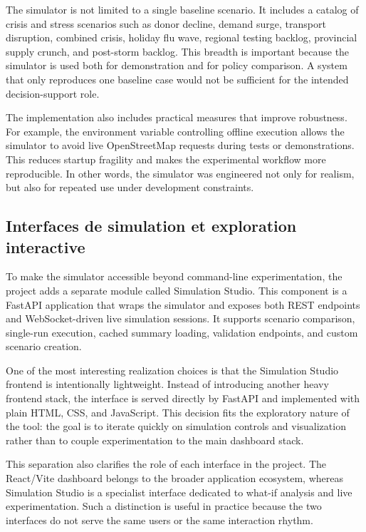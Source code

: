 The simulator is not limited to a single baseline scenario. It includes a catalog of crisis and stress scenarios such as donor decline, demand surge, transport disruption, combined crisis, holiday flu wave, regional testing backlog, provincial supply crunch, and post-storm backlog. This breadth is important because the simulator is used both for demonstration and for policy comparison. A system that only reproduces one baseline case would not be sufficient for the intended decision-support role.

The implementation also includes practical measures that improve robustness. For example, the environment variable controlling offline execution allows the simulator to avoid live OpenStreetMap requests during tests or demonstrations. This reduces startup fragility and makes the experimental workflow more reproducible. In other words, the simulator was engineered not only for realism, but also for repeated use under development constraints.

\subsection{Interfaces de simulation et exploration interactive}
\label{sec:simulation-studio-realization}

To make the simulator accessible beyond command-line experimentation, the project adds a separate module called Simulation Studio. This component is a FastAPI application that wraps the simulator and exposes both REST endpoints and WebSocket-driven live simulation sessions. It supports scenario comparison, single-run execution, cached summary loading, validation endpoints, and custom scenario creation.

One of the most interesting realization choices is that the Simulation Studio frontend is intentionally lightweight. Instead of introducing another heavy frontend stack, the interface is served directly by FastAPI and implemented with plain HTML, CSS, and JavaScript. This decision fits the exploratory nature of the tool: the goal is to iterate quickly on simulation controls and visualization rather than to couple experimentation to the main dashboard stack.

This separation also clarifies the role of each interface in the project. The React/Vite dashboard belongs to the broader application ecosystem, whereas Simulation Studio is a specialist interface dedicated to what-if analysis and live experimentation. Such a distinction is useful in practice because the two interfaces do not serve the same users or the same interaction rhythm.

